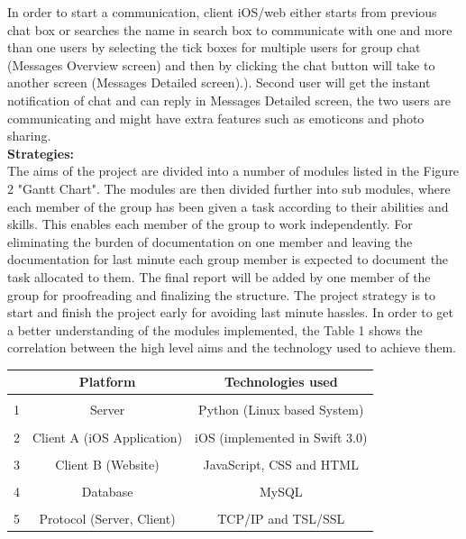 \documentclass[12pt]{article}
\begin{document}
In order to start a communication, client iOS/web either starts from previous chat box or searches the name in search box to communicate with one and more than one users by selecting the tick boxes for multiple users for group chat (Messages Overview screen) and then by clicking the chat button will take to another screen (Messages Detailed screen).). Second user will get the instant notification of chat and can reply in Messages Detailed screen, the two users are communicating and might have extra features such as emoticons and photo sharing.\\
\textbf{Strategies:} \\
The aims of the project are divided into a number of modules listed in the Figure 2 "Gantt Chart". The modules are then divided further into sub modules, where each member of the group has been given a task according to their abilities and skills. This enables each member of the group to work independently. For eliminating the burden of documentation on one member and leaving the documentation for last minute each group member is expected to document the task allocated to them. The final report will be added by one member of the group for proofreading and finalizing the structure. The project strategy is to start and finish the project early for avoiding last minute hassles. In order to get a better understanding of the modules implemented, the Table 1 shows the correlation between the high level aims and the technology used to achieve them. \\

\begin{table}[!ht]
\centering
{} \label{tab:title} 
\smallskip
\begin{tabular}{l c c}
\hline
& Platform & Technologies used\\[0.5ex]
\hline
&&\\[-2ex]
1 & Server & Python (Linux based System) \\[0.5ex]
\hline
&&\\[-2ex]
2 & Client A (iOS Application) & iOS (implemented in Swift 3.0) \\[0.5ex]
\hline
&&\\[-2ex]
3 & Client B (Website) & JavaScript, CSS and HTML \\[0.5ex]
\hline
&&\\[-2ex]
4 & Database & MySQL \\[0.5ex]
\hline
&&\\[-2ex]
5 & Protocol (Server, Client) & TCP/IP and TSL/SSL \\[0.5ex]
\hline
\end{tabular}
\end{table}
\end{document}
